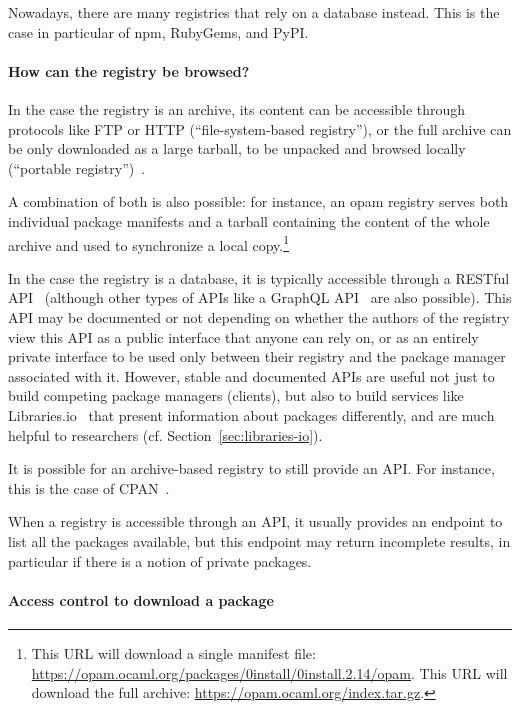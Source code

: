 Nowadays, there are many registries that rely on a database instead.
This is the case in particular of npm, RubyGems, and PyPI.

\paragraph{How can the registry be browsed?}

In the case the registry is an archive, its content can be accessible through protocols like FTP or HTTP (``file-system-based registry''), or the full archive can be only downloaded as a large tarball, to be unpacked and browsed locally (``portable registry'')~\cite{nesbitt2019categories}.

A combination of both is also possible: for instance, an opam registry serves both individual package manifests and a tarball containing the content of the whole archive and used to synchronize a local copy.\footnote{
	This URL will download a single manifest file: \url{https://opam.ocaml.org/packages/0install/0install.2.14/opam}.
	This URL will download the full archive: \url{https://opam.ocaml.org/index.tar.gz}.
}

In the case the registry is a database, it is typically accessible through a RESTful API~\cite{fielding2000} (although other types of APIs like a GraphQL API~\cite{byron2017graphql} are also possible).
This API may be documented or not depending on whether the authors of the registry view this API as a public interface that anyone can rely on, or as an entirely private interface to be used only between their registry and the package manager associated with it.
However, stable and documented APIs are useful not just to build competing package managers (clients), but also to build services like Libraries.io~\cite{andrew_nesbitt_2017_808273} that present information about packages differently, and are much helpful to researchers (cf. Section~\ref{sec:libraries-io}).

It is possible for an archive-based registry to still provide an API.
For instance, this is the case of CPAN~\cite{metacpan_api}.

When a registry is accessible through an API, it usually provides an endpoint to list all the packages available, but this endpoint may return incomplete results, in particular if there is a notion of private packages.

\paragraph{Access control to download a package}

